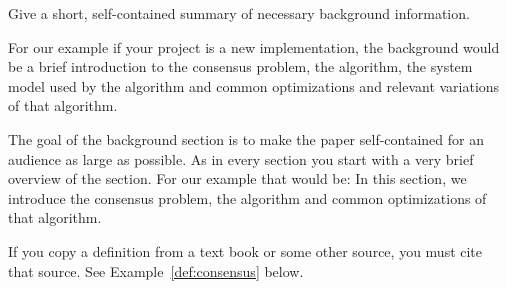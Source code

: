 Give a short, self-contained summary of necessary background
information. 

For our example if your project is a new \paxos implementation, the background
would be a brief introduction to the consensus problem, the \paxos algorithm,
the system model used by the \paxos algorithm
and common optimizations and relevant variations of that algorithm.

The goal of the background section is to make the paper 
self-contained for an audience as large as possible. As in every
section you start with a very brief overview of the section.
For our example that would be: In this section, we introduce the consensus problem,
the \paxos algorithm and common optimizations of that algorithm.

If you copy a definition from a text book or some other source, you must cite that source. 
See Example~\ref{def:consensus} below. 